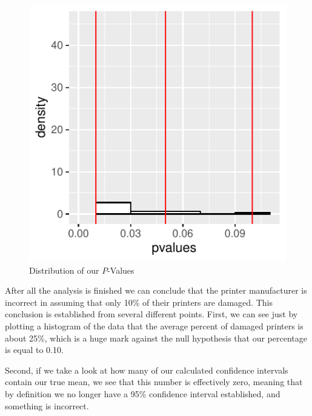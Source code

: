\documentclass[10pt]{report}\usepackage[]{graphicx}\usepackage[]{xcolor}
\makeatletter
\def\maxwidth{ %
  \ifdim\Gin@nat@width>\linewidth
    \linewidth
  \else
    \Gin@nat@width
  \fi
}
\newenvironment{kframe}{%
 \def\at@end@of@kframe{}%
 \ifinner\ifhmode%
  \def\at@end@of@kframe{\end{minipage}}%
  \begin{minipage}{\columnwidth}%
 \fi\fi%
 \def\FrameCommand##1{\hskip\@totalleftmargin \hskip-\fboxsep
 \colorbox{shadecolor}{##1}\hskip-\fboxsep
     \hskip-\linewidth \hskip-\@totalleftmargin \hskip\columnwidth}%
 \MakeFramed {\advance\hsize-\width
   \@totalleftmargin\z@ \linewidth\hsize
   \@setminipage}}%
 {\par\unskip\endMakeFramed%
 \at@end@of@kframe}
\newenvironment{knitrout}{}{} %
\makeatother
\begin{document}
\begin{easylist}[enumerate]
\begin{knitrout}
\begin{kframe}
{\ttfamily\noindent\color{warningcolor}{\#\# Warning: Removed 1 rows containing missing values (geom\_bar).}}\end{kframe}\begin{figure}[H]

{\centering \includegraphics[width=\maxwidth]{figure/pvalues_new-1} 

}

\caption[Distribution of our $P$-Values]{Distribution of our $P$-Values}\label{fig:pvalues_new}
\end{figure}


\end{knitrout}

        After all the analysis is finished we can conclude that the printer manufacturer is incorrect in assuming that
        only 10\% of their printers are damaged. This conclusion is established from several different points. First, we
        can see just by plotting a histogram of the data that the average percent of damaged printers is about 25\%,
        which is a huge mark against the null hypothesis that our percentage is equal to 0.10.\newline

        Second, if we take a look at how many of our calculated confidence intervals contain our true mean, we see that
        this number is effectively zero, meaning that by definition we no longer have a 95\% confidence interval
        established, and something is incorrect.\newline


\end{easylist}
\end{document}
